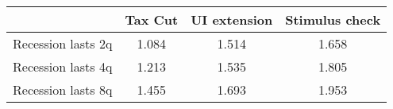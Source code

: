 \begin{tabular}{@{}lccc@{}} 
\toprule 
& Tax Cut    & UI extension    & Stimulus check    \\  \midrule 
Recession lasts 2q &1.084  & 1.514  & 1.658     \\ 
Recession lasts 4q &1.213  & 1.535  & 1.805     \\ 
Recession lasts 8q &1.455  & 1.693  & 1.953     \\ 
\end{tabular}  
